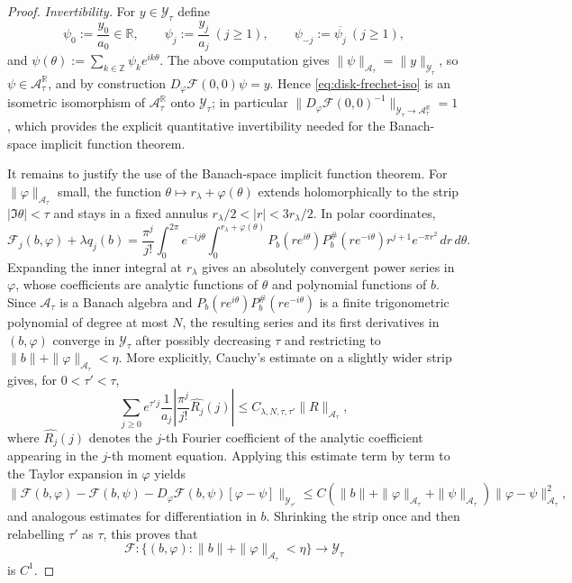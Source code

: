 \documentclass[a4paper,11pt,reqno]{amsart}
\numberwithin{equation}{section}
\theoremstyle{plain} %
\theoremstyle{definition} %
\theoremstyle{remark}
\newcommand{\R}{\mathbb{R}}
\newcommand{\Z}{\mathbb{Z}}
\begin{document}
\begin{proof}
\emph{Invertibility.} For \(y\in\mathcal Y_\tau\) define
\begin{equation}\label{eq:disk-frechet-inverse}
\psi_0:=\frac{y_0}{a_0}\in\R,
\qquad
\psi_j:=\frac{y_j}{a_j}\ (j\ge1),
\qquad
\psi_{-j}:=\overline{\psi_j}\ (j\ge1),
\end{equation}
and \(\psi(\theta):=\sum_{k\in\Z}\psi_k e^{ik\theta}\). The above
computation gives \(\|\psi\|_{\mathcal A_\tau}=\|y\|_{\mathcal Y_\tau}\), so
\(\psi\in\mathcal A_\tau^\R\), and by construction
\(D_\varphi\mathcal F(0,0)\psi=y\). Hence \eqref{eq:disk-frechet-iso} is an
isometric isomorphism of \(\mathcal A_\tau^\R\) onto \(\mathcal Y_\tau\); in
particular
\(\|D_\varphi\mathcal F(0,0)^{-1}\|_{\mathcal Y_\tau\to\mathcal A_\tau^\R}=1\),
which provides the explicit quantitative invertibility needed for the
Banach-space implicit function theorem.

It remains to justify the use of the Banach-space implicit function theorem.
For \(\|\varphi\|_{\mathcal A_\tau}\) small, the function
\(\theta\mapsto r_\lambda+\varphi(\theta)\) extends holomorphically to the
strip \(|\Im\theta|<\tau\) and stays in a fixed annulus
\(r_\lambda/2<|r|<3r_\lambda/2\). In polar coordinates,
\[
\mathcal F_j(b,\varphi)+\lambda q_j(b)
=
\frac{\pi^j}{j!}\int_0^{2\pi}e^{-ij\theta}
\int_0^{r_\lambda+\varphi(\theta)}
P_b(re^{i\theta})P_b^\#(re^{-i\theta})r^{j+1}e^{-\pi r^2}\,dr\,d\theta .
\]
Expanding the inner integral at \(r_\lambda\) gives an absolutely convergent
power series in \(\varphi\), whose coefficients are analytic functions of
\(\theta\) and polynomial functions of \(b\). Since \(\mathcal A_\tau\) is a
Banach algebra and \(P_b(re^{i\theta})P_b^\#(re^{-i\theta})\) is a finite
trigonometric polynomial of degree at most \(N\), the resulting series and
its first derivatives in \((b,\varphi)\) converge in \(\mathcal Y_\tau\) after
possibly decreasing \(\tau\) and restricting to
\(\|b\|+\|\varphi\|_{\mathcal A_\tau}<\eta\). More explicitly, Cauchy's
estimate on a slightly wider strip gives, for \(0<\tau'<\tau\),
\[
\sum_{j\ge0}e^{\tau' j}\frac1{a_j}
\left|
\frac{\pi^j}{j!}\widehat{R_j}(j)
\right|
\le
C_{\lambda,N,\tau,\tau'}\|R\|_{\mathcal A_\tau},
\]
where \(\widehat{R_j}(j)\) denotes the \(j\)-th Fourier coefficient of the
analytic coefficient appearing in the \(j\)-th moment equation. Applying this
estimate term by term to the Taylor expansion in \(\varphi\) yields
\[
\|\mathcal F(b,\varphi)-\mathcal F(b,\psi)
-D_\varphi\mathcal F(b,\psi)[\varphi-\psi]\|_{\mathcal Y_{\tau'}}
\le
C(\|b\|+\|\varphi\|_{\mathcal A_\tau}
+\|\psi\|_{\mathcal A_\tau})
\|\varphi-\psi\|_{\mathcal A_\tau}^2,
\]
and analogous estimates for differentiation in \(b\). Shrinking the strip
once and then relabelling \(\tau'\) as \(\tau\), this proves that
\[
\mathcal F:
\{(b,\varphi):\|b\|+\|\varphi\|_{\mathcal A_\tau}<\eta\}
\longrightarrow \mathcal Y_\tau
\]
is \(C^1\).


\end{proof}
\end{document}

